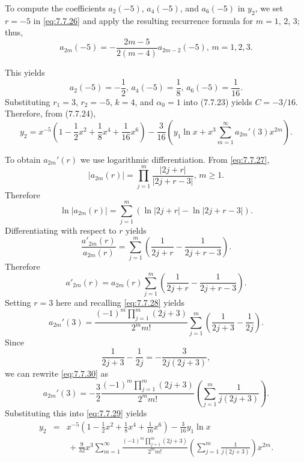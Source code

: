 \begin{examplesolution}
To compute the coefficients $a_{2}(-5)$, $a_{4}(-5)$, and $a_{6}(-5)$ in $y_{2}$, we set $r=-5$ in
\eqref{eq:7.7.26} and apply the resulting recurrence formula for $m=1$, $2$, $3$; thus,
\[
  a_{2m}(-5)=-\frac{2m-5}{2(m-4)}a_{2m-2}(-5),\,m=1,2,3.
\]

This yields
\[
  a_{2}(-5)=-\frac{1}{2},\,a_{4}(-5)=\frac{1}{8},\,a_{6}(-5)=\frac{1}{16}.
\]
Substituting $r_{1}=3$, $r_{2}=-5$, $k=4$, and $\alpha_{0}=1$ into \textup{(7.7.23)} yields
$C=-3/16$. Therefore, from \textup{(7.7.24)},
\begin{equation}
  \label{eq:7.7.29}y_{2}=x^{-5}\left(1-\frac{1}{2}x^{2}+\frac{1}{8}x^{4}+\frac{1}{16}x^{6}\right) -\frac{3}{16}\left(y_{1}\ln x+x^{3}\sum_{m=1}^{\infty}a_{2m}'(3)x^{2m}\right).
\end{equation}

To obtain $a_{2m}'(r)$ we use logarithmic differentiation. From \eqref{eq:7.7.27},
\[
  |a_{2m}(r)|=\prod_{j=1}^{m}\frac{|2j+r|}{|2j+r-3|},\,m\ge1.
\]
Therefore
\[
  \ln|a_{2m}(r)|=\sum^{m}_{j=1}\left(\ln|2j+r|-\ln|2j+r-3|\right).
\]
Differentiating with respect to $r$ yields
\[
  \frac{a'_{2m}(r)}{a_{2m}(r)}=\sum^{m}_{j=1}\left(\frac{1}{2j+r}-\frac{1}{2j+r-3}\right).
\]
Therefore
\[
  a'_{2m}(r)=a_{2m}(r)\sum^{m}_{j=1}\left(\frac{1}{2j+r}-\frac{1}{2j+r-3}\right).
\]
Setting $r=3$ here and recalling \eqref{eq:7.7.28} yields
\begin{equation}
  \label{eq:7.7.30}a_{2m}'(3)=\frac{(-1)^{m}\prod_{j=1}^{m}(2j+3)}{2^{m}m!}\sum_{j=1}^{m}\left(\frac{1}{2j+3}-\frac{1}{2j}\right).
\end{equation}
Since
\[
  \frac{1}{2j+3}-\frac{1}{2j}=-\frac{3}{2j(2j+3)},
\]
we can rewrite \eqref{eq:7.7.30} as
\[
  a_{2m}'(3)=-\frac{3}{2}\frac{(-1)^{m}\prod_{j=1}^{m}(2j+3)}{2^{m}m!}\left(\sum_{j=1}^{m}\frac{1}{j(2j+3)}\right).
\]
Substituting this into \eqref{eq:7.7.29} yields
\begin{eqnarray*}
  y_{2} & = & x^{-5}\left(1-\frac{1}{2}x^{2}+\frac{1}{8}x^{4}+\frac{1}{16}x^{6}\right)-\frac{3}{16}y_{1}\ln x \\[10pt]
        &   & \,+\frac{9}{32}x^{3}\sum_{m=1}^{\infty}\frac{(-1)^{m}\prod_{j=1}^{m}(2j+3)}{2^{m}m!}\left(\sum_{j=1}^{m}\frac{1}{j(2j+3)}\right)x^{2m}.
\end{eqnarray*}
\end{examplesolution}

